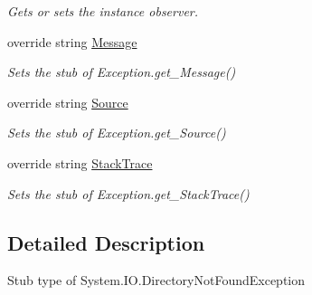 \begin{DoxyCompactItemize}
\begin{DoxyCompactList}\small\item\em Gets or sets the instance observer.\end{DoxyCompactList}\item 
override string \hyperlink{class_system_1_1_i_o_1_1_fakes_1_1_stub_directory_not_found_exception_a7a5df144b0a6c19a1a9d56abb2051631}{Message}
\begin{DoxyCompactList}\small\item\em Sets the stub of Exception.\-get\-\_\-\-Message()\end{DoxyCompactList}\item 
override string \hyperlink{class_system_1_1_i_o_1_1_fakes_1_1_stub_directory_not_found_exception_af13b17141aae06db60ce48e9973eb16b}{Source}
\begin{DoxyCompactList}\small\item\em Sets the stub of Exception.\-get\-\_\-\-Source()\end{DoxyCompactList}\item 
override string \hyperlink{class_system_1_1_i_o_1_1_fakes_1_1_stub_directory_not_found_exception_ad9dd9d18a5db5e360c410e17289eaae3}{Stack\-Trace}
\begin{DoxyCompactList}\small\item\em Sets the stub of Exception.\-get\-\_\-\-Stack\-Trace()\end{DoxyCompactList}\end{DoxyCompactItemize}


\subsection{Detailed Description}
Stub type of System.\-I\-O.\-Directory\-Not\-Found\-Exception



